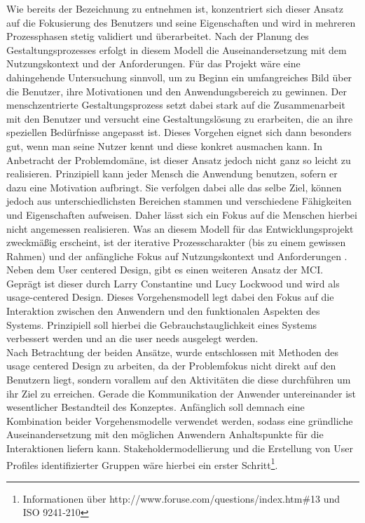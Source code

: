 Wie bereits der Bezeichnung zu entnehmen ist, konzentriert sich dieser Ansatz auf die Fokusierung des Benutzers und seine Eigenschaften und wird in mehreren Prozessphasen stetig validiert und überarbeitet. Nach der Planung des Gestaltungsprozesses erfolgt in diesem Modell die Auseinandersetzung mit dem Nutzungskontext und der Anforderungen. Für das Projekt wäre eine dahingehende Untersuchung sinnvoll, um zu Beginn ein umfangreiches Bild über die Benutzer, ihre Motivationen und den Anwendungsbereich zu gewinnen. 
Der menschzentrierte Gestaltungsprozess setzt dabei stark auf die Zusammenarbeit mit den Benutzer und versucht eine Gestaltungslösung zu erarbeiten, die an ihre speziellen Bedürfnisse angepasst ist. Dieses Vorgehen eignet sich dann besonders gut, wenn man seine Nutzer kennt und diese konkret ausmachen kann. In Anbetracht der Problemdomäne, ist dieser Ansatz jedoch nicht ganz so leicht zu realisieren. Prinzipiell kann jeder Mensch die Anwendung benutzen, sofern er dazu eine Motivation aufbringt. Sie verfolgen dabei alle das selbe Ziel, können jedoch aus unterschiedlichsten Bereichen stammen und verschiedene Fähigkeiten und Eigenschaften aufweisen. Daher lässt sich ein Fokus auf die Menschen hierbei nicht angemessen realisieren. Was an diesem Modell für das Entwicklungsprojekt zweckmäßig erscheint, ist der iterative Prozesscharakter (bis zu einem gewissen Rahmen) und der anfängliche Fokus auf Nutzungskontext und Anforderungen .\\
Neben dem User centered Design, gibt es einen weiteren Ansatz der MCI. Geprägt ist dieser durch Larry Constantine und Lucy Lockwood und wird als usage-centered Design. Dieses Vorgehensmodell legt dabei den Fokus auf die Interaktion zwischen den Anwendern und den funktionalen Aspekten des Systems. Prinzipiell soll hierbei die Gebrauchstauglichkeit eines Systems verbessert werden und an die user needs ausgelegt werden. \\
Nach Betrachtung der beiden Ansätze, wurde entschlossen mit Methoden des usage centered Design zu arbeiten, da der Problemfokus nicht direkt auf den Benutzern liegt, sondern vorallem auf den Aktivitäten die diese durchführen um ihr Ziel zu erreichen. Gerade die Kommunikation der Anwender untereinander ist wesentlicher Bestandteil des Konzeptes. Anfänglich soll demnach eine Kombination beider Vorgehensmodelle verwendet werden, sodass eine gründliche Auseinandersetzung mit den möglichen Anwendern Anhaltspunkte für die Interaktionen liefern kann. Stakeholdermodellierung und die Erstellung von User Profiles identifizierter Gruppen wäre hierbei ein erster Schritt\footnote{Informationen über http://www.foruse.com/questions/index.htm\#13 und ISO 9241-210}. 

\newpage



\newpage



\newpage



\newpage





\newpage

